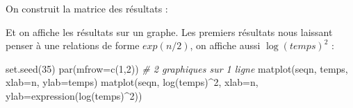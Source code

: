 \documentclass[
]{article}
\newenvironment{Shaded}{\begin{snugshade}}{\end{snugshade}}
\newcommand{\AttributeTok}[1]{\textcolor[rgb]{0.77,0.63,0.00}{#1}}
\newcommand{\CommentTok}[1]{\textcolor[rgb]{0.56,0.35,0.01}{\textit{#1}}}
\newcommand{\ControlFlowTok}[1]{\textcolor[rgb]{0.13,0.29,0.53}{\textbf{#1}}}
\newcommand{\DecValTok}[1]{\textcolor[rgb]{0.00,0.00,0.81}{#1}}
\newcommand{\FunctionTok}[1]{\textcolor[rgb]{0.00,0.00,0.00}{#1}}
\newcommand{\NormalTok}[1]{#1}
\newcommand{\OtherTok}[1]{\textcolor[rgb]{0.56,0.35,0.01}{#1}}
\newcommand{\SpecialCharTok}[1]{\textcolor[rgb]{0.00,0.00,0.00}{#1}}
\newcommand{\StringTok}[1]{\textcolor[rgb]{0.31,0.60,0.02}{#1}}
\begin{document}
On construit la matrice des résultats :

\begin{Shaded}
\end{Shaded}

Et on affiche les résultats sur un graphe. Les premiers résultats nous
laissant penser à une relations de forme \(exp(n/2)\), on affiche aussi
\(\log(temps)^2\) :

\begin{Shaded}
\begin{Highlighting}[]
\FunctionTok{set.seed}\NormalTok{(}\DecValTok{35}\NormalTok{)}
\FunctionTok{par}\NormalTok{(}\AttributeTok{mfrow=}\FunctionTok{c}\NormalTok{(}\DecValTok{1}\NormalTok{,}\DecValTok{2}\NormalTok{)) }\CommentTok{\# 2 graphiques sur 1 ligne}
\FunctionTok{matplot}\NormalTok{(seqn, temps, }\AttributeTok{xlab=}\StringTok{\textquotesingle{}n\textquotesingle{}}\NormalTok{, }\AttributeTok{ylab=}\StringTok{\textquotesingle{}temps\textquotesingle{}}\NormalTok{)}
\FunctionTok{matplot}\NormalTok{(seqn, }\FunctionTok{log}\NormalTok{(temps)}\SpecialCharTok{\^{}}\DecValTok{2}\NormalTok{, }\AttributeTok{xlab=}\StringTok{\textquotesingle{}n\textquotesingle{}}\NormalTok{, }\AttributeTok{ylab=}\FunctionTok{expression}\NormalTok{(}\FunctionTok{log}\NormalTok{(temps)}\SpecialCharTok{\^{}}\DecValTok{2}\NormalTok{))}
\end{Highlighting}
\end{Shaded}
\end{document}
